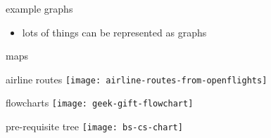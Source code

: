\begin{frame}{example graphs}
\begin{itemize}
\item lots of things can be represented as graphs
\end{itemize}
\end{frame}

\begin{frame}{maps}
\end{frame}

\begin{frame}{airline routes}
\texttt{[image: airline-routes-from-openflights]}
\end{frame}

\begin{frame}{flowcharts}
\texttt{[image: geek-gift-flowchart]}
\end{frame}

\begin{frame}[label=preReqTree]{pre-requisite tree}
\texttt{[image: bs-cs-chart]}
\end{frame}
